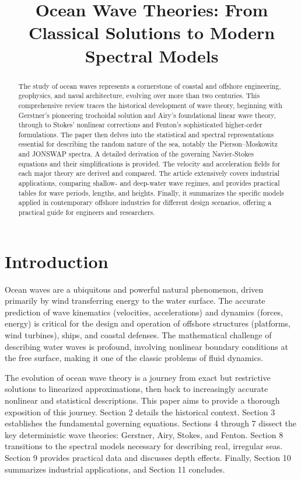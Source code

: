 \documentclass[11pt,a4paper]{article}
\title{Ocean Wave Theories: From Classical Solutions to Modern Spectral Models}
\author{}
\date{}
\begin{document}
\maketitle

\begin{abstract}
\noindent The study of ocean waves represents a cornerstone of coastal and offshore engineering, geophysics, and naval architecture, evolving over more than two centuries. This comprehensive review traces the historical development of wave theory, beginning with Gerstner's pioneering trochoidal solution and Airy's foundational linear wave theory, through to Stokes' nonlinear corrections and Fenton’s sophisticated higher-order formulations. The paper then delves into the statistical and spectral representations essential for describing the random nature of the sea, notably the Pierson–Moskowitz and JONSWAP spectra. A detailed derivation of the governing Navier-Stokes equations and their simplifications is provided. The velocity and acceleration fields for each major theory are derived and compared. The article extensively covers industrial applications, comparing shallow- and deep-water wave regimes, and provides practical tables for wave periods, lengths, and heights. Finally, it summarizes the specific models applied in contemporary offshore industries for different design scenarios, offering a practical guide for engineers and researchers.
\end{abstract}

\newpage
\tableofcontents
\newpage

\section{Introduction}
Ocean waves are a ubiquitous and powerful natural phenomenon, driven primarily by wind transferring energy to the water surface. The accurate prediction of wave kinematics (velocities, accelerations) and dynamics (forces, energy) is critical for the design and operation of offshore structures (platforms, wind turbines), ships, and coastal defenses. The mathematical challenge of describing water waves is profound, involving nonlinear boundary conditions at the free surface, making it one of the classic problems of fluid dynamics.

The evolution of ocean wave theory is a journey from exact but restrictive solutions to linearized approximations, then back to increasingly accurate nonlinear and statistical descriptions. This paper aims to provide a thorough exposition of this journey. Section 2 details the historical context. Section 3 establishes the fundamental governing equations. Sections 4 through 7 dissect the key deterministic wave theories: Gerstner, Airy, Stokes, and Fenton. Section 8 transitions to the spectral models necessary for describing real, irregular seas. Section 9 provides practical data and discusses depth effects. Finally, Section 10 summarizes industrial applications, and Section 11 concludes.
\end{document}
